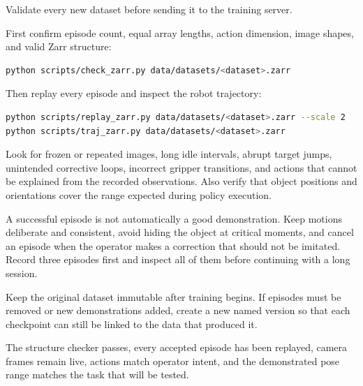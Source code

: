 Validate every new dataset before sending it to the training server.

First confirm episode count, equal array lengths, action dimension, image
shapes, and valid Zarr structure:

\begin{lstlisting}[language=bash]
python scripts/check_zarr.py data/datasets/<dataset>.zarr
\end{lstlisting}

Then replay every episode and inspect the robot trajectory:

\begin{lstlisting}[language=bash]
python scripts/replay_zarr.py data/datasets/<dataset>.zarr --scale 2
python scripts/traj_zarr.py data/datasets/<dataset>.zarr
\end{lstlisting}

Look for frozen or repeated images, long idle intervals, abrupt target jumps,
unintended corrective loops, incorrect gripper transitions, and actions that
cannot be explained from the recorded observations. Also verify that object
positions and orientations cover the range expected during policy execution.

\begin{methodbox}
A successful episode is not automatically a good demonstration. Keep motions
deliberate and consistent, avoid hiding the object at critical moments, and
cancel an episode when the operator makes a correction that should not be
imitated. Record three episodes first and inspect all of them before continuing
with a long session.
\end{methodbox}

Keep the original dataset immutable after training begins. If episodes must be
removed or new demonstrations added, create a new named version so that each
checkpoint can still be linked to the data that produced it.

\begin{checkpointbox}
The structure checker passes, every accepted episode has been replayed, camera
frames remain live, actions match operator intent, and the demonstrated pose
range matches the task that will be tested.
\end{checkpointbox}
